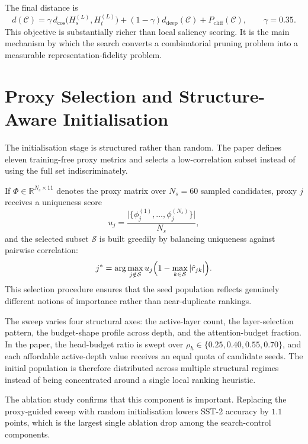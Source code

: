 The final distance is
\begin{equation}
  d(\mathcal{C})
  =
  \gamma\, d_{\mathrm{cos}}\!\bigl(H_s^{(L)},H_t^{(L)}\bigr)
  + (1-\gamma)d_{\mathrm{deep}}(\mathcal{C})
  + P_{\mathrm{cliff}}(\mathcal{C}),
  \qquad \gamma = 0.35.
  \label{eq:design_fitness}
\end{equation}
This objective is substantially richer than local saliency scoring. It is the main mechanism by which the search converts a combinatorial pruning problem into a measurable representation-fidelity problem.

\section{Proxy Selection and Structure-Aware Initialisation}
\label{subsec:initialisation}

The initialisation stage is structured rather than random. The paper defines eleven training-free proxy metrics and selects a low-correlation subset instead of using the full set indiscriminately.

If $\Phi\in\mathbb{R}^{N_s\times 11}$ denotes the proxy matrix over $N_s=60$ sampled candidates, proxy $j$ receives a uniqueness score
\begin{equation}
  u_j
  =
  \frac{\bigl|\{\phi_j^{(1)},\ldots,\phi_j^{(N_s)}\}\bigr|}{N_s},
  \label{eq:design_proxy_uniqueness}
\end{equation}
and the selected subset $\mathcal{S}$ is built greedily by balancing uniqueness against pairwise correlation:
\begin{equation}
  j^*
  =
  \arg\max_{j\notin \mathcal{S}}
  u_j
  \Bigl(
    1-\max_{k\in\mathcal{S}}|\hat r_{jk}|
  \Bigr).
  \label{eq:design_proxy_select}
\end{equation}
This selection procedure ensures that the seed population reflects genuinely different notions of importance rather than near-duplicate rankings.

The sweep varies four structural axes: the active-layer count, the layer-selection pattern, the budget-shape profile across depth, and the attention-budget fraction. In the paper, the head-budget ratio is swept over $\rho_h\in\{0.25,0.40,0.55,0.70\}$, and each affordable active-depth value receives an equal quota of candidate seeds. The initial population is therefore distributed across multiple structural regimes instead of being concentrated around a single local ranking heuristic.

The ablation study confirms that this component is important. Replacing the proxy-guided sweep with random initialisation lowers SST-2 accuracy by $1.1$ points, which is the largest single ablation drop among the search-control components.

